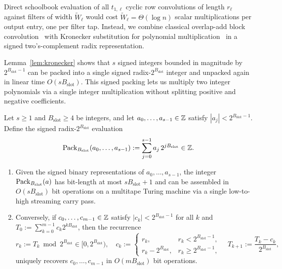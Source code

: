 Direct schoolbook evaluation of all $t_{1,\ell}$ cyclic row convolutions of length $r_\ell$ against filters of width $\tilde{W}_\ell$ would cost $\tilde{W}_\ell = \Theta(\log n)$ scalar multiplications per output entry, one per filter tap. Instead, we combine classical overlap-add block convolution~\cite{Nussbaumer82} with Kronecker substitution for polynomial multiplication~\cite{Schonhage82,Harvey09} in a signed two's-complement radix representation.

Lemma~\ref{lem:kronecker} shows that $s$ signed integers bounded in magnitude by $2^{B_{\mathrm{slot}}-1}$ can be packed into a single signed radix-$2^{B_{\mathrm{slot}}}$ integer and unpacked again in linear time $O(s B_{\mathrm{slot}})$. This signed packing lets us multiply two integer polynomials via a single integer multiplication without splitting positive and negative coefficients.

\begin{lemma}\label{lem:kronecker}
Let $s \ge 1$ and $B_{\mathrm{slot}} \ge 4$ be integers, and let $a_0, \dots, a_{s-1} \in \mathbb{Z}$ satisfy $|a_j| < 2^{B_{\mathrm{slot}}-1}$. Define the signed radix-$2^{B_{\mathrm{slot}}}$ evaluation
\begin{equation}\label{eq:pack-def}
  \operatorname{Pack}_{B_{\mathrm{slot}}}(a_0, \dots, a_{s-1}) := \sum_{j=0}^{s-1} a_j \, 2^{j B_{\mathrm{slot}}} \in \mathbb{Z}.
\end{equation}
\begin{enumerate}[label=(\roman*),leftmargin=*]
  \item Given the signed binary representations of $a_0, \dots, a_{s-1}$, the integer $\operatorname{Pack}_{B_{\mathrm{slot}}}(a)$ has bit-length at most $s B_{\mathrm{slot}} + 1$ and can be assembled in $O(s B_{\mathrm{slot}})$ bit operations on a multitape Turing machine via a single low-to-high streaming carry pass.
  \item Conversely, if $c_0, \dots, c_{m-1} \in \mathbb{Z}$ satisfy $|c_k| < 2^{B_{\mathrm{slot}}-1}$ for all $k$ and $T_0 := \sum_{k=0}^{m-1} c_k 2^{k B_{\mathrm{slot}}}$, then the recurrence
  \[
    r_k := T_k \bmod 2^{B_{\mathrm{slot}}} \in [0, 2^{B_{\mathrm{slot}}}), \quad c_k := \begin{cases} r_k, & r_k < 2^{B_{\mathrm{slot}}-1}, \\ r_k - 2^{B_{\mathrm{slot}}}, & r_k \ge 2^{B_{\mathrm{slot}}-1}, \end{cases} \quad T_{k+1} := \frac{T_k - c_k}{2^{B_{\mathrm{slot}}}},
  \]
  uniquely recovers $c_0, \dots, c_{m-1}$ in $O(m B_{\mathrm{slot}})$ bit operations.
\end{enumerate}
\end{lemma}

